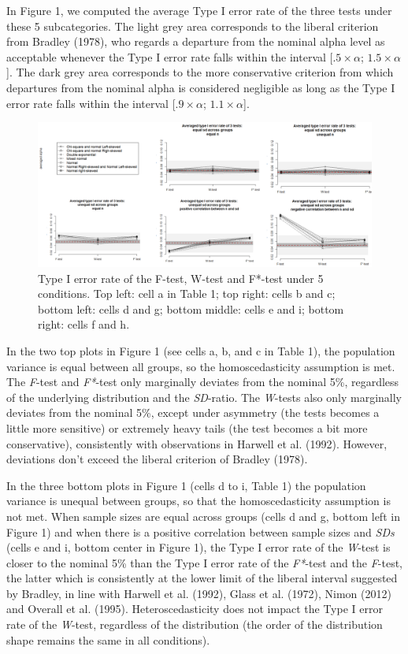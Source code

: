 \documentclass[man,floatsintext]{apa6}
\begin{document}
In Figure 1, we computed the average Type I error rate of the three tests under these 5 subcategories. The light grey area corresponds to the liberal criterion from Bradley (1978), who regards a departure from the nominal alpha level as acceptable whenever the Type I error rate falls within the interval {[}\(.5 \times \alpha\); \(1.5 \times \alpha\){]}. The dark grey area corresponds to the more conservative criterion from which departures from the nominal alpha is considered negligible as long as the Type I error rate falls within the interval {[}\(.9 \times \alpha\); \(1.1 \times \alpha\){]}.

\begin{figure}
\includegraphics[width=1\linewidth]{Rmarkdown folder/Rmarkdown inputs/Fig 1_after revision} \caption{Type I error rate of the F-test, W-test and F*-test under 5 conditions. Top left: cell a in Table 1; top right: cells b and c; bottom left: cells d and g; bottom middle: cells e and i; bottom right: cells f and h. }\label{fig:unnamed-chunk-1}
\end{figure}

In the two top plots in Figure 1 (see cells a, b, and c in Table 1), the population variance is equal between all groups, so the homoscedasticity assumption is met. The \emph{F}-test and \emph{F*}-test only marginally deviates from the nominal 5\%, regardless of the underlying distribution and the \emph{SD}-ratio. The \emph{W}-tests also only marginally deviates from the nominal 5\%, except under asymmetry (the tests becomes a little more sensitive) or extremely heavy tails (the test becomes a bit more conservative), consistently with observations in Harwell et al. (1992). However, deviations don't exceed the liberal criterion of Bradley (1978).

In the three bottom plots in Figure 1 (cells d to i, Table 1) the population variance is unequal between groups, so that the homoscedasticity assumption is not met. When sample sizes are equal across groups (cells d and g, bottom left in Figure 1) and when there is a positive correlation between sample sizes and \emph{SDs} (cells e and i, bottom center in Figure 1), the Type I error rate of the \emph{W}-test is closer to the nominal 5\% than the Type I error rate of the \emph{F*}-test and the \emph{F}-test, the latter which is consistently at the lower limit of the liberal interval suggested by Bradley, in line with Harwell et al. (1992), Glass et al. (1972), Nimon (2012) and Overall et al. (1995). Heteroscedasticity does not impact the Type I error rate of the \emph{W}-test, regardless of the distribution (the order of the distribution shape remains the same in all conditions).
\end{document}
